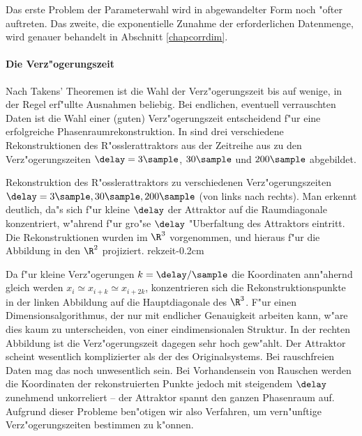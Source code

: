 Das erste Problem der Parameterwahl wird in abgewandelter Form noch "ofter auftreten. Das
zweite, die exponentielle Zunahme der erforderlichen Datenmenge, wird genauer
behandelt in Abschnitt \ref{chapcorrdim}.

\paragraph{Die Verz"ogerungszeit}
\label{chapdelay}

Nach Takens' Theoremen ist die Wahl der Verz"ogerungszeit bis auf wenige, in der Regel
erf"ullte Ausnahmen beliebig. Bei endlichen, eventuell verrauschten Daten ist die Wahl
einer \naja(guten) Verz"ogerungszeit entscheidend f"ur eine erfolgreiche
Phasenraumrekonstruktion. In  sind drei verschiedene Rekonstruktionen des
R"osslerattraktors aus der Zeitreihe aus  zu den Verz"ogerungszeiten
$\delay=3\sample$, $30\sample$ und $200\sample$ abgebildet.

 {Rekonstruktion des
  R"osslerattraktors zu verschiedenen Verz"ogerungszeiten $\delay=3\sample, 30\sample,
  200\sample$ (von links nach rechts). Man erkennt deutlich, da"s sich f"ur kleine
  $\delay$ der Attraktor auf die Raumdiagonale konzentriert, w"ahrend f"ur gro"se $\delay$
  "Uberfaltung des Attraktors eintritt. Die Rekonstruktionen wurden im $\R^3$ vorgenommen,
  und hieraus f"ur die Abbildung in den $\R^2$ projiziert.  
}{rekzeit}{-0.2cm}

Da f"ur kleine Verz"ogerungen $k=\delay/\sample$ die Koordinaten ann"ahernd gleich werden
$x_i\simeq x_{i+k}\simeq x_{i+2k}$, konzentrieren sich die Rekonstruktionspunkte in der
linken Abbildung auf die Hauptdiagonale des $\R^3$. F"ur einen Dimensionsalgorithmus, der
nur mit endlicher Genauigkeit arbeiten kann, w"are dies kaum zu unterscheiden, von einer
eindimensionalen Struktur. In der rechten Abbildung ist die Verz"ogerungszeit dagegen sehr
hoch gew"ahlt.  Der Attraktor scheint wesentlich komplizierter als der des
Originalsystems. Bei rauschfreien Daten mag das noch unwesentlich sein. Bei Vorhandensein
von Rauschen werden die Koordinaten der rekonstruierten Punkte jedoch mit
steigendem $\delay$ zunehmend unkorreliert -- der Attraktor spannt den ganzen Phasenraum
auf. Aufgrund dieser Probleme ben"otigen wir also Verfahren, um vern"unftige
Verz"ogerungszeiten bestimmen zu k"onnen.


